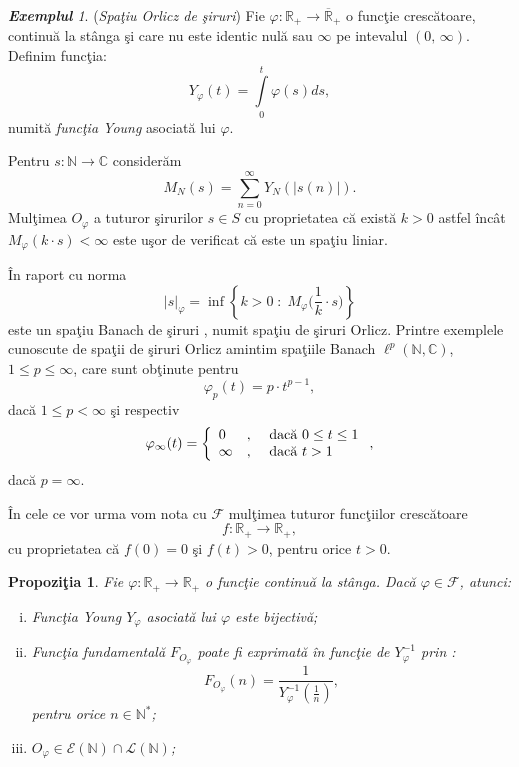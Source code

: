 \documentclass[ a4paper, 12pt]{report}
\newtheorem{prop}[theorem]{\bf Propozi\c tia }
\theoremstyle{definition}
\theoremstyle{remark}
\newtheorem{exemple}{\bf Exemplul}[section]
\numberwithin{equation}{section}
\begin{document}
\begin{exemple} ({\it Spa\c tiu Orlicz de \c siruri})
Fie $\varphi : \mathbb{R}_{+} \rightarrow \overline{\mathbb{R}}_{+}$ o func\c tie cresc\u atoare, continu\u a la st\^anga \c si care nu este identic nul\u a sau $\infty$ pe intevalul $(0,\, \infty)$.
Definim func\c tia:
$$ Y_\varphi (t) = \int\limits_{0}^{t} \varphi(s) ds,$$ numit\u a {\it func\c tia Young} asociat\u a lui $\varphi$.

Pentru $s : \mathbb{N} \rightarrow \mathbb{C}$ consider\u am
$$M_N (s)= \sum\limits_{n=0}^{\infty} Y_N(\lvert s(n) \rvert).$$
Mul\c timea $O_\varphi$ a  tuturor \c sirurilor $s \in S$ cu proprietatea c\u a exist\u a $k > 0$ astfel \^inc\^at $M_\varphi(k \cdot s)< \infty$ este u\c sor de verificat c\u a este un spa\c tiu liniar.

\^In raport cu norma
$$\lvert s \rvert_\varphi = \inf\left\{ k>0 \; : \; M_\varphi\Big(\frac{1}{k} \cdot s\Big) \right\}$$ este un spa\c tiu Banach de \c siruri , numit spa\c tiu de \c siruri Orlicz.
Printre exemplele cunoscute de spa\c tii de \c siruri Orlicz amintim spa\c tiile Banach $\ell^{p}(\mathbb{N},\mathbb{C})$, $1 \leq p \leq \infty$, care sunt ob\c tinute pentru
$$\varphi_p(t) = p \cdot t^{p-1},$$ dac\u a $1 \leq p < \infty$ \c si respectiv $$\varphi_\infty(t) = \left\{ \begin{array}{lcl}
0&,& \hbox{ dac\u a } 0 \leq t \leq 1\\
\infty &,& \hbox{ dac\u a } t > 1 \end{array} \right.,$$ dac\u a $p =\infty$.
\end{exemple}

\medskip

\^In cele ce vor urma vom nota cu $\mathcal{F}$ mul\c timea tuturor func\c tiilor cresc\u atoare
$$f : \mathbb{R}_{+} \rightarrow \mathbb{R}_{+},$$ cu proprietatea c\u a $f(0) = 0$ \c si  $f(t) > 0$, pentru orice $t > 0$.

\begin{prop}
Fie $\varphi : \mathbb{R}_{+} \rightarrow \mathbb{R}_{+}$ o func\c tie continu\u a la st\^anga. Dac\u a $\varphi \in \mathcal{F}$, atunci:
\begin{enumerate}[(i)]
\item Func\c tia Young $Y_\varphi$ asociat\u a lui $\varphi$ este bijectiv\u a;

\item Func\c tia fundamental\u a $F_{O_{\varphi}}$ poate fi exprimat\u a \^in func\c tie de $Y_\varphi^{-1}$ prin :
$$F_{O_{\varphi}} (n) = \frac{1}{Y_{\varphi}^{-1}(\frac{1}{n})},$$ pentru orice $n \in \mathbb{N}^{\ast}$;

\item $O_\varphi \in \mathcal{E}(\mathbb{N}) \cap \mathcal{L}(\mathbb{N})$;
\end{enumerate}
\end{prop}
\end{document}
